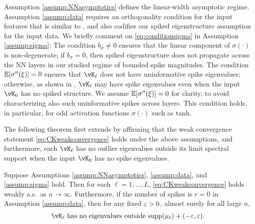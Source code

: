 Assumption \ref{assump:NNasymptotics} defines the linear-width asymptotic
regime. Assumption \ref{assump:data} requires an orthogonality condition
for the input features that is similar to \cite[Definition 3.1]{fan2020spectra},
and also codifies our spiked eigenstructure assumption for the input data.
We briefly comment on \eqref{eq:conditionsigma}
in Assumption \ref{assump:sigma}: The condition $b_\sigma \neq 0$ ensures that
the linear component of $\sigma(\cdot)$ is non-degenerate; if $b_\sigma=0$,
then spiked eigenstructure does not propagate across the NN layers in our
studied regime of bounded spike magnitudes. The condition $\mathbb{E}[\sigma''(\xi)]=0$
ensures that $\vK_\ell$ does not have uninformative spike eigenvalues;
otherwise, as shown in \cite{benigni2022largest}, $\vK_\ell$ may have
spike eigenvalues even when the input $\vK_0$ has no spiked structure.
We assume $\mathbb{E}[\sigma''(\xi)]=0$ for clarity, to avoid characterizing also such
uninformative spikes across layers. This condition holds, in particular, for odd
activation functions $\sigma(\cdot)$ such as $\mathrm{tanh}$.

The following theorem first extends \cite[Theorem 3.4]{fan2020spectra} by
affirming that the weak convergence statement \eqref{eq:CKweakconvergence}
holds under the above assumptions, and furthermore, each $\vK_\ell$ has
no outlier eigenvalues outside its limit spectral support when the input
$\vK_0$ has no spike eigenvalues.

\begin{theorem}\label{thm:no_outlier_ck}
Suppose Assumptions \ref{assump:NNasymptotics}, \ref{assump:data},
and \ref{assump:sigma} hold. Then for each $\ell=1,\ldots,L$,
\eqref{eq:CKweakconvergence} holds weakly a.s.\ as $n \to \infty$. 
Furthermore, if the number of spikes is $r=0$ in Assumption \ref{assump:data},
then for any fixed $\varepsilon>0$, almost surely for all large $n$,
\begin{align*}
\vK_\ell \text{ has no eigenvalues outside }
\supp{\mu_\ell}+(-\eps,\eps).
\end{align*}
\end{theorem}

